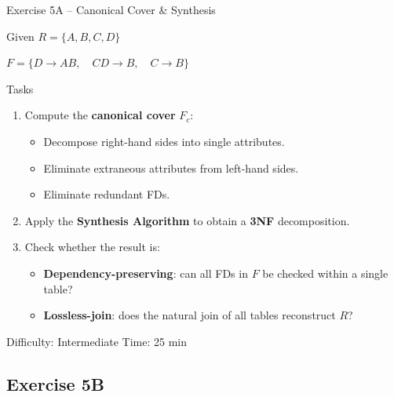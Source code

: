 \documentclass[10pt]{beamer}
\begin{document}
\begin{frame}{Exercise 5A -- Canonical Cover \& Synthesis}
  \begin{block}{Given}
    $R = \{A, B, C, D\}$

    \vspace{4pt}
    $F = \{D \to AB,\quad CD \to B,\quad C \to B\}$
  \end{block}

  \begin{block}{Tasks}
    \begin{enumerate}
      \item Compute the \textbf{canonical cover} $F_c$:
        \begin{itemize}
          \item Decompose right-hand sides into single attributes.
          \item Eliminate extraneous attributes from left-hand sides.
          \item Eliminate redundant FDs.
        \end{itemize}
      \item Apply the \textbf{Synthesis Algorithm} to obtain a \textbf{3NF} decomposition.
      \item Check whether the result is:
        \begin{itemize}
          \item \textbf{Dependency-preserving}: can all FDs in $F$ be checked within a single table?
          \item \textbf{Lossless-join}: does the natural join of all tables reconstruct $R$?
        \end{itemize}
    \end{enumerate}
  \end{block}

  \begin{alertblock}{Difficulty: Intermediate \quad Time: 25 min}
  \end{alertblock}
\end{frame}

\subsection{Exercise 5B}
\end{document}
